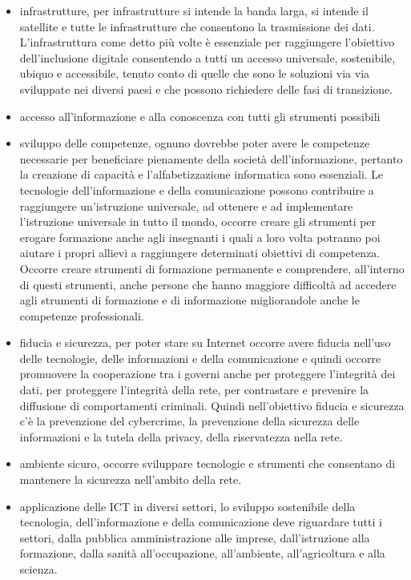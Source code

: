 \begin{itemize}
    \item  infrastrutture, per infrastrutture si intende la banda larga, si intende il satellite e tutte le infrastrutture che consentono la trasmissione dei dati. L'infrastruttura come detto più volte è essenziale per raggiungere l'obiettivo dell'inclusione digitale consentendo a tutti un accesso universale, sostenibile, ubiquo e accessibile, tenuto conto di quelle che sono le soluzioni via via sviluppate nei diversi paesi e che possono richiedere delle fasi di transizione.
    \item accesso all'informazione e alla conoscenza con tutti gli strumenti possibili
    \item sviluppo delle competenze, ognuno dovrebbe poter avere le competenze necessarie per beneficiare pienamente della società dell'informazione, pertanto la creazione di capacità e l'alfabetizzazione informatica sono essenziali. Le tecnologie dell'informazione e della comunicazione possono contribuire a raggiungere un'istruzione universale, ad ottenere e ad implementare l'istruzione universale in tutto il mondo, occorre creare gli strumenti per erogare formazione anche agli insegnanti i quali a loro volta potranno poi aiutare i propri allievi a raggiungere determinati obiettivi di competenza. Occorre creare strumenti di formazione permanente e comprendere, all'interno di questi strumenti, anche persone che hanno maggiore difficoltà ad accedere agli strumenti di formazione e di informazione migliorandole anche le competenze professionali.
    \item fiducia e sicurezza, per poter stare su Internet occorre avere fiducia nell'uso delle tecnologie, delle informazioni e della comunicazione e quindi occorre promuovere la cooperazione tra i governi anche per proteggere l'integrità dei dati, per proteggere l'integrità della rete, per contrastare e prevenire la diffusione di comportamenti criminali. Quindi nell'obiettivo fiducia e sicurezza c'è la prevenzione del cybercrime, la prevenzione della sicurezza delle informazioni e la tutela della privacy, della riservatezza nella rete.
    \item ambiente sicuro, occorre sviluppare tecnologie e strumenti che consentano di mantenere la sicurezza nell'ambito della rete.
    \item applicazione delle ICT in diversi settori, lo sviluppo sostenibile della tecnologia, dell'informazione e della comunicazione deve riguardare tutti i settori, dalla pubblica amministrazione alle imprese, dall'istruzione alla formazione, dalla sanità all'occupazione, all'ambiente, all'agricoltura e alla scienza. 

\end{itemize}

